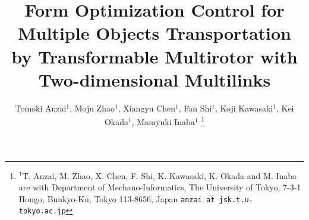 \documentclass[letterpaper, 10 pt, conference]{ieeeconf}  %
\title{\LARGE \bf
  Form Optimization Control for Multiple Objects Transportation by Transformable Multirotor with Two-dimensional Multilinks
}
\author{Tomoki Anzai$^{1}$, Moju Zhao$^{1}$, Xiangyu Chen$^{1}$, Fan Shi$^{1}$, Koji Kawasaki$^{1}$, Kei Okada$^{1}$, Masayuki Inaba$^{1}$%
\thanks{$^{1}$T. Anzai, M. Zhao, X. Chen, F. Shi, K. Kawasaki, K. Okada and M. Inaba are with Department of Mechano-Informatics, The University of Tokyo, 7-3-1 Hongo, Bunkyo-Ku, Tokyo 113-8656, Japan
       {\tt\small anzai at jsk.t.u-tokyo.ac.jp}}%
}
\begin{document}
\maketitle
\thispagestyle{empty}
\pagestyle{empty}

\begin{abstract}

\end{abstract}









\addtolength{\textheight}{-12cm}   %

%
%



\end{document}
